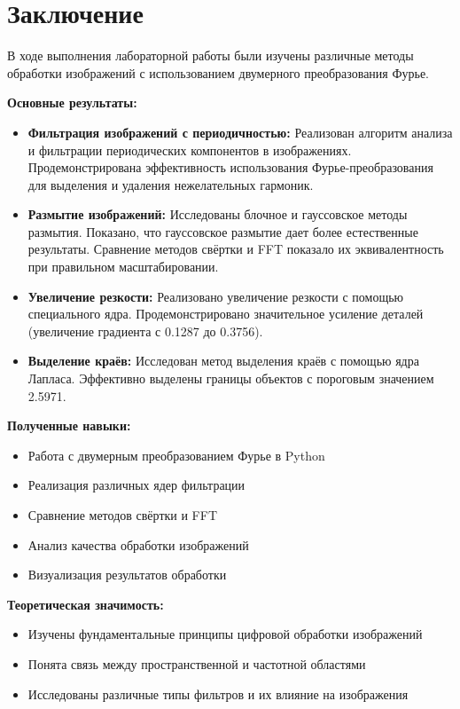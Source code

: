 \section*{Заключение}

В ходе выполнения лабораторной работы были изучены различные методы обработки изображений с использованием двумерного преобразования Фурье.

\textbf{Основные результаты:}
\begin{itemize}
    \item \textbf{Фильтрация изображений с периодичностью:} Реализован алгоритм анализа и фильтрации периодических компонентов в изображениях. Продемонстрирована эффективность использования Фурье-преобразования для выделения и удаления нежелательных гармоник.
    
    \item \textbf{Размытие изображений:} Исследованы блочное и гауссовское методы размытия. Показано, что гауссовское размытие дает более естественные результаты. Сравнение методов свёртки и FFT показало их эквивалентность при правильном масштабировании.
    
    \item \textbf{Увеличение резкости:} Реализовано увеличение резкости с помощью специального ядра. Продемонстрировано значительное усиление деталей (увеличение градиента с 0.1287 до 0.3756).
    
    \item \textbf{Выделение краёв:} Исследован метод выделения краёв с помощью ядра Лапласа. Эффективно выделены границы объектов с пороговым значением 2.5971.
\end{itemize}

\textbf{Полученные навыки:}
\begin{itemize}
    \item Работа с двумерным преобразованием Фурье в Python
    \item Реализация различных ядер фильтрации
    \item Сравнение методов свёртки и FFT
    \item Анализ качества обработки изображений
    \item Визуализация результатов обработки
\end{itemize}

\textbf{Теоретическая значимость:}
\begin{itemize}
    \item Изучены фундаментальные принципы цифровой обработки изображений
    \item Понята связь между пространственной и частотной областями
    \item Исследованы различные типы фильтров и их влияние на изображения
\end{itemize}

